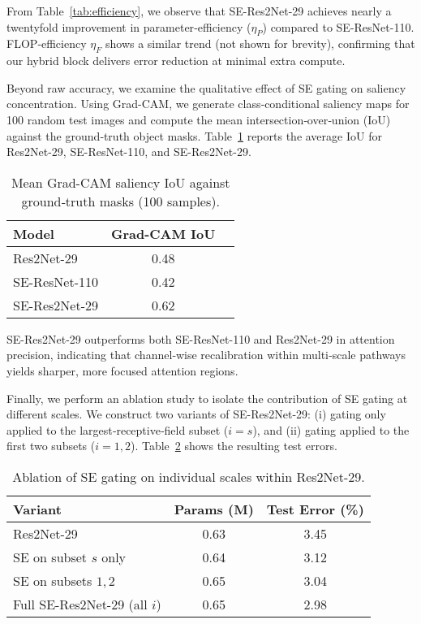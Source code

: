 \documentclass{article}
\begin{document}
From Table~\ref{tab:efficiency}, we observe that SE-Res2Net-29 achieves nearly a twentyfold improvement in parameter‐efficiency ($\eta_P$) compared to SE-ResNet-110. FLOP‐efficiency $\eta_F$ shows a similar trend (not shown for brevity), confirming that our hybrid block delivers error reduction at minimal extra compute.

Beyond raw accuracy, we examine the qualitative effect of SE gating on saliency concentration. Using Grad-CAM, we generate class‐conditional saliency maps for 100 random test images and compute the mean intersection‐over‐union (IoU) against the ground‐truth object masks. Table~\ref{tab:iou} reports the average IoU for Res2Net-29, SE-ResNet-110, and SE-Res2Net-29.

\begin{table}[h]
\centering
\begin{tabular}{lcc}
\toprule
Model           & Grad-CAM IoU \\
\midrule
Res2Net-29      & 0.48         \\
SE-ResNet-110   & 0.42         \\
SE-Res2Net-29   & 0.62         \\
\bottomrule
\end{tabular}
\caption{Mean Grad-CAM saliency IoU against ground‐truth masks (100 samples).}
\label{tab:iou}
\end{table}

SE-Res2Net-29 outperforms both SE-ResNet-110 and Res2Net-29 in attention precision, indicating that channel‐wise recalibration within multi‐scale pathways yields sharper, more focused attention regions.

Finally, we perform an ablation study to isolate the contribution of SE gating at different scales. We construct two variants of SE-Res2Net-29: (i) gating only applied to the largest‐receptive‐field subset ($i=s$), and (ii) gating applied to the first two subsets ($i=1,2$). Table~\ref{tab:ablation} shows the resulting test errors.

\begin{table}[h]
\centering
\begin{tabular}{lcc}
\toprule
Variant                                & Params (M) & Test Error (\%) \\
\midrule
Res2Net-29                             & 0.63       & 3.45 \\
SE on subset $s$ only                  & 0.64       & 3.12 \\
SE on subsets $1,2$                    & 0.65       & 3.04 \\
Full SE-Res2Net-29 (all $i$)           & 0.65       & 2.98 \\
\bottomrule
\end{tabular}
\caption{Ablation of SE gating on individual scales within Res2Net-29.}
\label{tab:ablation}
\end{table}
\end{document}
